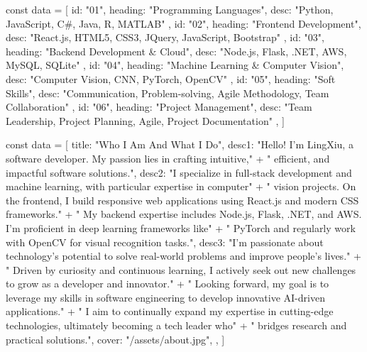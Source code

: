 const data = [
    {
        id: "01",
        heading: "Programming Languages",
        desc: "Python, JavaScript, C#, Java, R, MATLAB"
    },
    {
        id: "02",
        heading: "Frontend Development",
        desc: "React.js, HTML5, CSS3, JQuery, JavaScript, Bootstrap"
    },
    {
        id: "03",
        heading: "Backend Development & Cloud",
        desc: "Node.js, Flask, .NET, AWS, MySQL, SQLite"
    },
    {
        id: "04",
        heading: "Machine Learning & Computer Vision",
        desc: "Computer Vision, CNN, PyTorch, OpenCV"
    },
    {
        id: "05",
        heading: "Soft Skills",
        desc: "Communication, Problem-solving, Agile Methodology, Team Collaboration"
    },
    {
        id: "06",
        heading: "Project Management",
        desc: "Team Leadership, Project Planning, Agile, Project Documentation"
    },
]

const data = [
    {
        title: "Who I Am And What I Do",
        desc1: "Hello! I'm LingXiu, a software developer. My passion lies in crafting intuitive," +
            " efficient, and impactful software solutions.",
        desc2: "I specialize in full-stack development and machine learning, with particular expertise in computer" +
            " vision projects. On the frontend, I build responsive web applications using React.js and modern CSS frameworks." +
            " My backend expertise includes Node.js, Flask, .NET, and AWS. I'm proficient in deep learning frameworks like" +
            " PyTorch and regularly work with OpenCV for visual recognition tasks.",
        desc3: "I'm passionate about technology's potential to solve real-world problems and improve people's lives." +
            " Driven by curiosity and continuous learning, I actively seek out new challenges to grow as a developer and innovator." +
            " Looking forward, my goal is to leverage my skills in software engineering to develop innovative AI-driven applications." +
            " I aim to continually expand my expertise in cutting-edge technologies, ultimately becoming a tech leader who" +
            " bridges research and practical solutions.",
        cover: "/assets/about.jpg",
    },
]